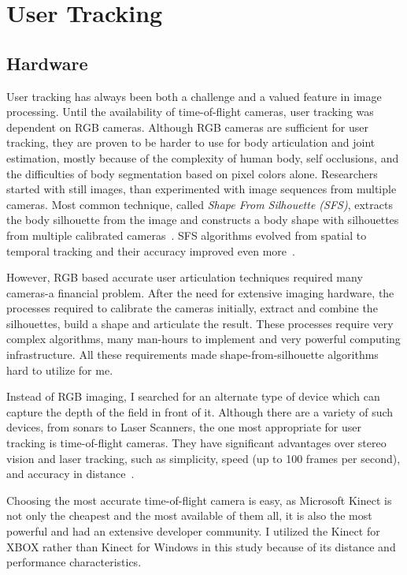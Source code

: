 \chapter{User Tracking}
\label{appendix_user_tracking}

\section{Hardware}

User tracking has always been both a challenge and a valued feature in image processing. Until the availability of time-of-flight cameras, user tracking was dependent on RGB cameras. Although RGB cameras are sufficient for user tracking, they are proven to be harder to use for body articulation and joint estimation, mostly because of the complexity of human body, self occlusions, and the difficulties of body segmentation based on pixel colors alone. Researchers started with still images, than experimented with image sequences from multiple cameras. Most common technique, called {\em Shape From Silhouette (SFS)}, extracts the body silhouette from the image and constructs a body shape with silhouettes from multiple calibrated cameras~\cite{Cheung2005}. SFS algorithms evolved from spatial to temporal tracking and their accuracy improved even more~\cite{Cheung2005}. 

However, RGB based accurate user articulation techniques required many cameras-a financial problem. After the need for extensive imaging hardware, the processes required to calibrate the cameras initially, extract and combine the silhouettes, build a shape and articulate the result. These processes require very complex algorithms, many man-hours to implement and very powerful computing infrastructure. All these requirements made shape-from-silhouette algorithms hard to utilize for me.

Instead of RGB imaging, I searched for an alternate type of device which can capture the depth of the field in front of it. Although there are a variety of such devices, from sonars to Laser Scanners, the one most appropriate for user tracking is time-of-flight cameras. They have significant advantages over stereo vision and laser tracking, such as simplicity, speed (up to 100 frames per second), and accuracy in distance~\cite{Kourosh2012}.

Choosing the most accurate time-of-flight camera is easy, as Microsoft Kinect is not only the cheapest and the most available of them all, it is also the most powerful and had an extensive developer community. I utilized the Kinect for XBOX rather than Kinect for Windows in this study because of its distance and performance characteristics.

